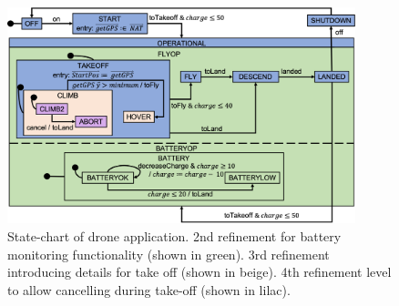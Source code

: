 
\begin{figure}[]
	\centering
	\includegraphics[width=0.90\textwidth, trim=0 30 0 0]{figures/Picture5.png}
	\caption{State-chart of drone application. 
		2nd refinement for battery monitoring functionality (shown in green).
		3rd refinement introducing details for take off (shown in beige).
		4th refinement level to allow cancelling during take-off (shown in lilac).}
	\label{fig:drone4}
\end{figure} 

